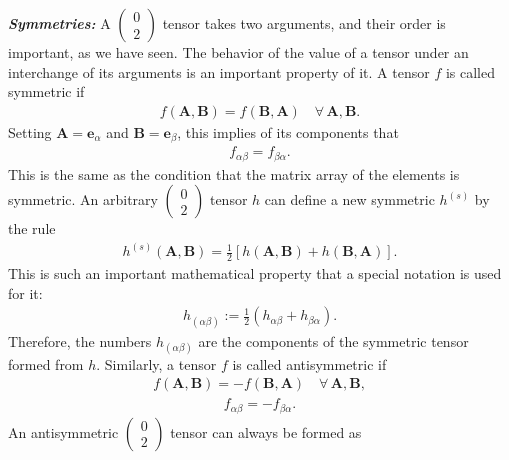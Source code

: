 \documentclass[12pt]{book}
\begin{document}
    \textit{\textbf{Symmetries:}} A \(\left(\begin{array}{c} 0 \\ 2 \end{array}\right)\) tensor takes two arguments, and their order is important, as we have seen. The behavior of the value of a tensor under an interchange of its arguments is an important property of it. A tensor \(f\) is called symmetric if
    \begin{align}
    f(\mathbf{A},\mathbf{B}) = f(\mathbf{B},\mathbf{A}) \quad \forall \, \mathbf{A}, \mathbf{B}. \tag{3.27}
    \end{align}
    Setting \(\mathbf{A} = \mathbf{e}_\alpha\) and \(\mathbf{B} = \mathbf{e}_\beta\), this implies of its components that
    \begin{align}
    f_{\alpha\beta} = f_{\beta\alpha}. \tag{3.28}
    \end{align}
    This is the same as the condition that the matrix array of the elements is symmetric. An arbitrary \(\left(\begin{array}{c} 0 \\ 2 \end{array}\right)\) tensor \(h\) can define a new symmetric \(h^{(s)}\) by the rule
    \begin{align}
    h^{(s)}(\mathbf{A},\mathbf{B}) = \frac{1}{2} \left[ h(\mathbf{A},\mathbf{B}) + h(\mathbf{B},\mathbf{A}) \right]. \tag{3.29}
    \end{align}
    This is such an important mathematical property that a special notation is used for it:
    \begin{align}
    h_{(\alpha\beta)} := \frac{1}{2} \left( h_{\alpha\beta} + h_{\beta\alpha} \right). \tag{3.31}
    \end{align}
    Therefore, the numbers \(h_{(\alpha\beta)}\) are the components of the symmetric tensor formed from \(h\).
    Similarly, a tensor \(f\) is called antisymmetric if
    \begin{align}
    f(\mathbf{A},\mathbf{B}) = -f(\mathbf{B},\mathbf{A}) \quad \forall \, \mathbf{A}, \mathbf{B}, \tag{3.32}
    \end{align}
    \begin{align}
    f_{\alpha\beta} = -f_{\beta\alpha}. \tag{3.33}
    \end{align}
    An antisymmetric \(\left(\begin{array}{c} 0 \\ 2 \end{array}\right)\) tensor can always be formed as
\end{document}
